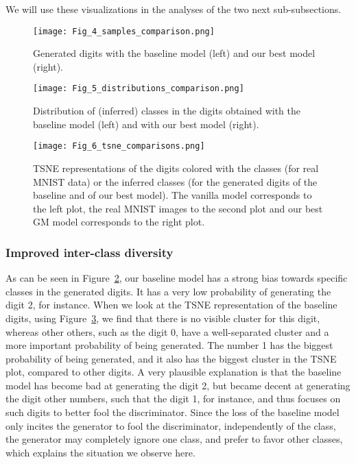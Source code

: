 \documentclass[10pt]{article}
\begin{document}
We will use these visualizations in the analyses of the two next sub-subsections.

\begin{figure}[H]
\centering
\texttt{[image: Fig\_4\_samples\_comparison.png]}
\caption{Generated digits with the baseline model (left) and our best model (right).}
\label{fig:fig_4}
\end{figure}

\begin{figure}[H]
\centering
\texttt{[image: Fig\_5\_distributions\_comparison.png]}
\caption{Distribution of (inferred) classes in the digits obtained with the baseline model (left) and with our best model (right).}
\label{fig:fig_5}
\end{figure}

\begin{figure}[H]
\centering
\texttt{[image: Fig\_6\_tsne\_comparisons.png]}
\caption{TSNE representations of the digits colored with the classes (for real MNIST data) or the inferred classes (for the generated digits of the baseline and of our best model). The vanilla model corresponds to the left plot, the real MNIST images to the second plot and our best GM model corresponds to the right plot.}
\label{fig:fig_6}
\end{figure}


\subsubsection{Improved inter-class diversity}

As can be seen in Figure~\ref{fig:fig_5}, our baseline model has a strong bias towards specific classes in the generated digits. It has a very low probability of generating the digit 2, for instance. When we look at the TSNE representation of the baseline digits, using Figure~\ref{fig:fig_6}, we find that there is no visible cluster for this digit, whereas other others, such as the digit 0, have a well-separated cluster and a more important probability of being generated. The number 1 has the biggest probability of being generated, and it also has the biggest cluster in the TSNE plot, compared to other digits. A very plausible explanation is that the baseline model has become bad at generating the digit 2, but became decent at generating the digit other numbers, such that the digit 1, for instance, and thus focuses on such digits to better fool the discriminator. Since the loss of the baseline model only incites the generator to fool the discriminator, independently of the class, the generator may completely ignore one class, and prefer to favor other classes, which explains the situation we observe here.
\end{document}
